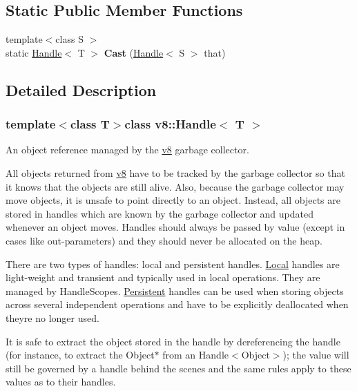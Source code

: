 \subsection*{Static Public Member Functions}
\begin{DoxyCompactItemize}
\item 
\hypertarget{classv8_1_1_handle_a78abe2e84ab0829779b714feea1bc4d1}{}{\footnotesize template$<$class S $>$ }\\static \hyperlink{classv8_1_1_handle}{Handle}$<$ T $>$ {\bfseries Cast} (\hyperlink{classv8_1_1_handle}{Handle}$<$ S $>$ that)\label{classv8_1_1_handle_a78abe2e84ab0829779b714feea1bc4d1}

\end{DoxyCompactItemize}


\subsection{Detailed Description}
\subsubsection*{template$<$class T$>$class v8\+::\+Handle$<$ T $>$}

An object reference managed by the \hyperlink{namespacev8}{v8} garbage collector.

All objects returned from \hyperlink{namespacev8}{v8} have to be tracked by the garbage collector so that it knows that the objects are still alive. Also, because the garbage collector may move objects, it is unsafe to point directly to an object. Instead, all objects are stored in handles which are known by the garbage collector and updated whenever an object moves. Handles should always be passed by value (except in cases like out-\/parameters) and they should never be allocated on the heap.

There are two types of handles\+: local and persistent handles. \hyperlink{classv8_1_1_local}{Local} handles are light-\/weight and transient and typically used in local operations. They are managed by Handle\+Scopes. \hyperlink{classv8_1_1_persistent}{Persistent} handles can be used when storing objects across several independent operations and have to be explicitly deallocated when they\textquotesingle{}re no longer used.

It is safe to extract the object stored in the handle by dereferencing the handle (for instance, to extract the Object$\ast$ from an Handle$<$\+Object$>$); the value will still be governed by a handle behind the scenes and the same rules apply to these values as to their handles. 

